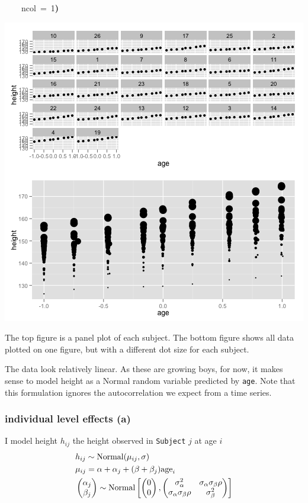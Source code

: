 \documentclass{article}
\makeatletter
\newcommand{\hlnumber}[1]{\textcolor[rgb]{0,0,0}{#1}}%
\newcommand{\hlkeyword}[1]{\textbf{#1}}%
\newcommand{\hlargument}[1]{\textcolor[rgb]{.69,.25,.02}{#1}}%
\newcommand{\hlstd}[1]{\textcolor[rgb]{0,0,0}{#1}}%
\newenvironment{kframe}{%
 \def\FrameCommand##1{\hskip\@totalleftmargin \hskip-\fboxsep
 \colorbox{shadecolor}{##1}\hskip-\fboxsep
     \hskip-\linewidth \hskip-\@totalleftmargin \hskip\columnwidth}%
 \MakeFramed {\advance\hsize-\width
   \@totalleftmargin\z@ \linewidth\hsize
   \@setminipage}}%
 {\par\unskip\endMakeFramed}
\newenvironment{knitrout}{}{} %
\makeatother
\begin{document}
\begin{knitrout}
{\begin{kframe}
\begin{flushleft}
\hlstd{}{\ }{\ }{\ }{\ }\hlargument{ncol}{\ }\hlargument{=}{\ }\hlnumber{1}\hlkeyword{)}\mbox{}
\normalfont
\end{flushleft}
\includegraphics{plot-ox} \end{kframe}}
\end{knitrout}


The top figure is a panel plot of each subject. 
The bottom figure shows all data plotted on one figure, but with a different dot size for each subject. 


The data look relatively linear. As these are growing boys, for now, it makes sense to model height as a Normal random variable predicted by {\tt age}. 
Note that this formulation ignores the autocorrelation we expect from a time series.

\subsubsection*{individual level effects (a)}

I model height $h_{ij}$ the height observed in {\tt Subject} $j$ at age $i$
\begin{align*}
&h_{ij} \sim {\rm Normal}(\mu_{ij}, \sigma)\\
&\mu_{ij} = \alpha + \alpha_j + (\beta + \beta_j){\rm age}_i\\
&\left( \begin{matrix}\alpha_j\\ \beta_j\end{matrix}\right) \sim {\rm Normal}
\left [ \left( \begin{matrix}0\\ 0\end{matrix}\right), \left( \begin{matrix}\sigma^2_\alpha & \sigma_\alpha \sigma_\beta \rho\\ \sigma_\alpha \sigma_\beta \rho &\sigma^2_\beta\end{matrix}\right)\right]
\end{align*}
\end{document}
